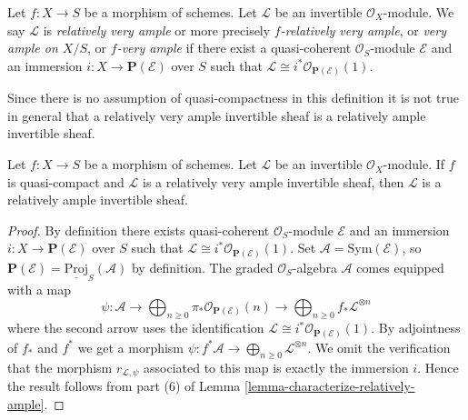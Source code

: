\begin{definition}
\label{definition-very-ample}
Let $f : X \to S$ be a morphism of schemes.
Let $\mathcal{L}$ be an invertible $\mathcal{O}_X$-module.
We say $\mathcal{L}$ is {\it relatively very ample} or more
precisely {\it $f$-relatively very ample}, or
{\it very ample on $X/S$}, or {\it $f$-very ample} if
there exist a quasi-coherent $\mathcal{O}_S$-module
$\mathcal{E}$ and an immersion $i : X \to \mathbf{P}(\mathcal{E})$
over $S$ such that
$\mathcal{L} \cong i^*\mathcal{O}_{\mathbf{P}(\mathcal{E})}(1)$.
\end{definition}

\noindent
Since there is no assumption of quasi-compactness in this definition it is not
true in general that a relatively very ample invertible sheaf is a relatively
ample invertible sheaf.

\begin{lemma}
\label{lemma-ample-very-ample}
Let $f : X \to S$ be a morphism of schemes.
Let $\mathcal{L}$ be an invertible $\mathcal{O}_X$-module.
If $f$ is quasi-compact and $\mathcal{L}$ is a relatively
very ample invertible sheaf, then $\mathcal{L}$ is a relatively
ample invertible sheaf.
\end{lemma}

\begin{proof}
By definition there exists quasi-coherent $\mathcal{O}_S$-module
$\mathcal{E}$ and an immersion $i : X \to \mathbf{P}(\mathcal{E})$
over $S$ such that
$\mathcal{L} \cong i^*\mathcal{O}_{\mathbf{P}(\mathcal{E})}(1)$.
Set $\mathcal{A} = \text{Sym}(\mathcal{E})$, so
$\mathbf{P}(\mathcal{E}) = \underline{\text{Proj}}_S(\mathcal{A})$
by definition. The graded $\mathcal{O}_S$-algebra $\mathcal{A}$
comes equipped with a map
$$
\psi :
\mathcal{A} \to
\bigoplus\nolimits_{n \geq 0}
\pi_*\mathcal{O}_{\mathbf{P}(\mathcal{E})}(n) \to
\bigoplus\nolimits_{n \geq 0}
f_*\mathcal{L}^{\otimes n}
$$
where the second arrow uses the identification
$\mathcal{L} \cong i^*\mathcal{O}_{\mathbf{P}(\mathcal{E})}(1)$.
By adjointness of $f_*$ and $f^*$ we get a morphism
$\psi : f^*\mathcal{A} \to \bigoplus_{n \geq 0}\mathcal{L}^{\otimes n}$.
We omit the verification that the morphism $r_{\mathcal{L}, \psi}$
associated to this map is exactly the immersion $i$.
Hence the result follows from
part (6) of Lemma \ref{lemma-characterize-relatively-ample}.
\end{proof}

